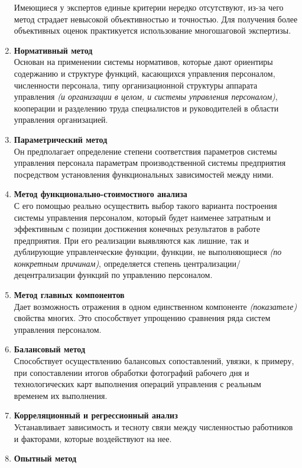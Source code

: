 \documentclass[a4paper,12pt,oneside,final]{extarticle}
\numberwithin{equation}{section}
\begin{document}
\begin{enumerate}
	Имеющиеся у экспертов единые критерии нередко отсутствуют, из-за чего метод страдает невысокой объективностью и точностью. 
	Для получения более объективных оценок практикуется использование многошаговой экспертизы.
	\item \textbf{Нормативный метод} \\ 
	Основан на применении системы нормативов, которые дают ориентиры содержанию и структуре функций, касающихся управления персоналом, численности персонала, типу организационной структуры аппарата управления \textit{(и организации в целом, и системы управления персоналом)}, кооперации и разделению труда специалистов и руководителей в области управления организацией.
	\item \textbf{Параметрический метод} \\ 
	Он предполагает определение степени соответствия параметров системы управления персонала параметрам производственной системы предприятия посредством установления функциональных зависимостей между ними.
	\item \textbf{Метод функционально-стоимостного анализа} \\ 
	С его помощью реально осуществить выбор такого варианта построения системы управления персоналом, который будет наименее затратным и эффективным с позиции достижения конечных результатов в работе предприятия. 
	При его реализации выявляются как лишние, так и дублирующие управленческие функции, функции, не выполняющиеся \textit{(по конкретным причинам)}, определяется степень централизации/децентрализации функций по управлению персоналом.
	\item \textbf{Метод главных компонентов} \\
	Дает возможность отражения в одном единственном компоненте \textit{(показателе)} свойства многих. 
	Это способствует упрощению сравнения ряда систем управления персоналом.
	\item \textbf{Балансовый метод} \\ 
	Способствует осуществлению балансовых сопоставлений, увязки, к примеру, при сопоставлении итогов обработки фотографий рабочего дня и технологических карт выполнения операций управления с реальным временем их выполнения.
	\item \textbf{Корреляционный и регрессионный анализ} \\ 
	Устанавливает зависимость и тесноту связи между численностью работников и факторами, которые воздействуют на нее.
	\item \textbf{Опытный метод} \\ 

\end{enumerate}
\end{document}
